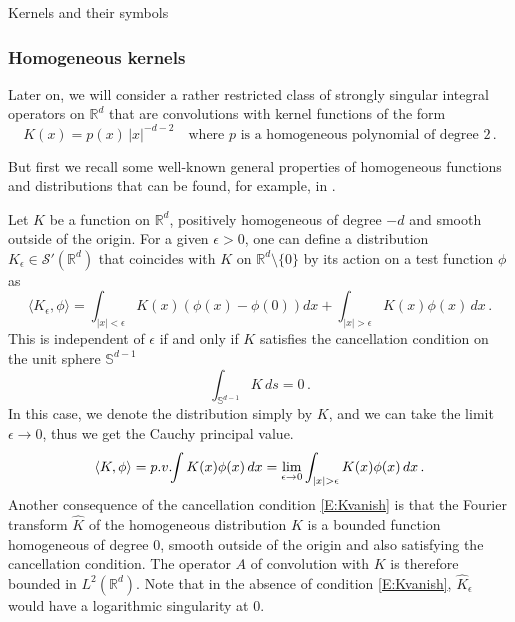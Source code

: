 \documentclass[12pt]{amsart}
\makeatletter
\def\subsection{\@startsection{section}{1}%
  \z@{1.2\linespacing\@plus\linespacing}{.5\linespacing}%
  {\normalfont\scshape\centering}}
\def\subsection{\@startsection{subsection}{2}%
  \z@{0.9\linespacing\@plus.7\linespacing}{-.5em}%
  {\normalfont\bfseries}}
\theoremstyle{definition}
\theoremstyle{remark}
\numberwithin{equation}{section}
\newcommand{\pv}{\mathop{\rm p.v.}}
\newcommand\R{{\mathbb R}}
\renewcommand\SS{{\mathbb S}}
\newcommand{\sS}{{\mathscr S}}
\let\hat=\widehat
\makeatother
\begin{document}
\subsection{Kernels and their symbols}\label{SS:kernels}
\subsubsection{Homogeneous kernels}\label{SSS:Homog}
Later on, we will consider a rather restricted class of strongly singular integral operators on $\R^{d}$ that are convolutions with 
kernel functions of the form 
\begin{equation}
\label{E:Kernels}
 K(x) = p(x)\,|x|^{-d-2} \quad \mbox{where $p$ is a homogeneous polynomial of degree $2$}\,.
\end{equation}

But first we recall some well-known general properties of homogeneous functions and distributions that can be found, for example, in \cite[Chap. III]{Gelfand-Shilov1_1964}.

Let $K$ be a function on $\R^{d}$, positively homogeneous of degree $-d$ and smooth outside of the origin. 
For a given $\epsilon>0$, one can define a distribution $K_{\epsilon}\in\sS'(\R^{d})$ that coincides with $K$ on $\R^{d}\setminus\{0\}$ by its action on a test function $\phi$ as
\begin{equation}
\label{E:Kepsphi}
 \langle K_{\epsilon}, \phi \rangle = \int_{|x|<\epsilon}K(x)(\phi(x)-\phi(0))dx
  + \int_{|x|>\epsilon} K(x)\phi(x)\,dx\,.
\end{equation}
This is independent of $\epsilon$ if and only if $K$ satisfies the cancellation condition on the unit sphere $\SS^{d-1}$
\begin{equation}
\label{E:Kvanish}
\int_{\SS^{d-1}}K\, ds=0\,.
\end{equation}
In this case, we denote the distribution simply by $K$, and we can take the limit 
$\epsilon\to0$, thus we get the Cauchy principal value.
\begin{equation}
\label{E:pvK}
 \langle K, \phi \rangle =
  \pv\!\!\int K(x)\phi(x)\, dx =
  \lim_{\epsilon\to0}\int_{|x|>\epsilon} K(x)\phi(x)\, dx\,.
\end{equation}
Another consequence of the cancellation condition \eqref{E:Kvanish} is that the Fourier transform $\hat K$ of the homogeneous distribution $K$ is a bounded function homogeneous of degree $0$, smooth outside of the origin and also satisfying the cancellation condition. The operator $A$ of convolution with $K$ is therefore bounded in $L^{2}(\R^{d})$.
Note that in the absence of condition \eqref{E:Kvanish}, $\hat K_{\epsilon}$ would have a logarithmic singularity at $0$.
\end{document}
